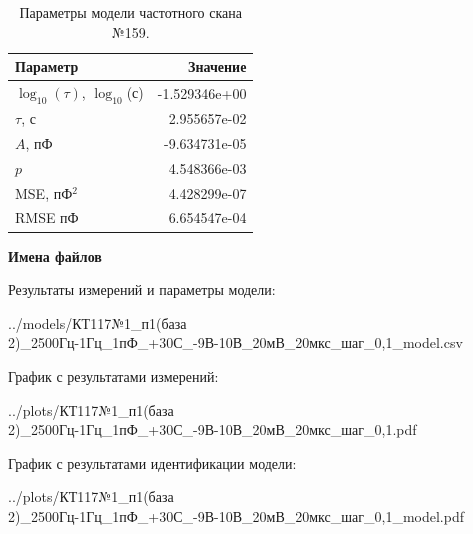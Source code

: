 \begin{table}[!ht]
    \centering
    \caption{Параметры модели частотного скана №159.}
    \begin{tabular}{|l|r|}
        \hline
        Параметр                                       & Значение                  \\ \hline
        $\log_{10}(\tau)$, $\log_{10}$(с)              & -1.529346e+00             \\ \hline
        $\tau$, с                                      & 2.955657e-02              \\ \hline
        $A$, пФ                                        & -9.634731e-05             \\ \hline
        $p$                                            & 4.548366e-03              \\ \hline
        MSE, пФ$^2$                                    & 4.428299e-07              \\ \hline
        RMSE пФ                                        & 6.654547e-04              \\ \hline
    \end{tabular}
    \label{table:frequency_scan_model_159}
\end{table}

\textbf{Имена файлов}

Результаты измерений и параметры модели:

\scriptsize../models/КТ117№1\_п1(база 2)\_2500Гц-1Гц\_1пФ\_+30С\_-9В-10В\_20мВ\_20мкс\_шаг\_0,1\_model.csv
\normalsize

График с результатами измерений:

\scriptsize../plots/КТ117№1\_п1(база 2)\_2500Гц-1Гц\_1пФ\_+30С\_-9В-10В\_20мВ\_20мкс\_шаг\_0,1.pdf
\normalsize

График с результатами идентификации модели:

\scriptsize../plots/КТ117№1\_п1(база 2)\_2500Гц-1Гц\_1пФ\_+30С\_-9В-10В\_20мВ\_20мкс\_шаг\_0,1\_model.pdf
\normalsize

